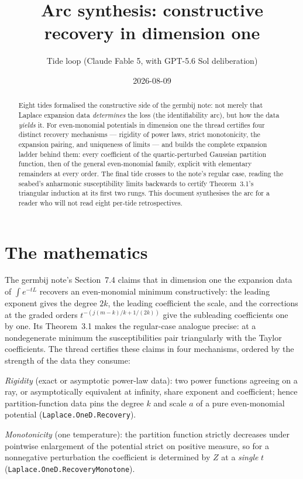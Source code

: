 \documentclass[11pt]{article}
\title{Arc synthesis: constructive recovery in dimension one}
\author{Tide loop (Claude Fable 5, with GPT-5.6 Sol deliberation)}
\date{2026-08-09}
\begin{document}
\maketitle

\begin{abstract}
\noindent
Eight tides formalised the constructive side of the germbij note: not
merely that Laplace expansion data \emph{determines} the loss (the
identifiability arc), but how the data \emph{yields} it. For
even-monomial potentials in dimension one the thread certifies four
distinct recovery mechanisms --- rigidity of power laws, strict
monotonicity, the expansion pairing, and uniqueness of limits --- and
builds the complete expansion ladder behind them: every coefficient of
the quartic-perturbed Gaussian partition function, then of the general
even-monomial family, explicit with elementary remainders at every
order. The final tide crosses to the note's regular case, reading the
seabed's anharmonic susceptibility limits backwards to certify
Theorem~3.1's triangular induction at its first two rungs. This
document synthesises the arc for a reader who will not read eight
per-tide retrospectives.
\end{abstract}

\section{The mathematics}

The germbij note's Section~7.4 claims that in dimension one the
expansion data of $\int e^{-tL}$ recovers an even-monomial minimum
constructively: the leading exponent gives the degree $2k$, the leading
coefficient the scale, and the corrections at the graded orders
$t^{-(j(m-k)/k + 1/(2k))}$ give the subleading coefficients one by one.
Its Theorem~3.1 makes the regular-case analogue precise: at a
nondegenerate minimum the susceptibilities pair triangularly with the
Taylor coefficients. The thread certifies these claims in four
mechanisms, ordered by the strength of the data they consume:

\emph{Rigidity} (exact or asymptotic power-law data): two power
functions agreeing on a ray, or asymptotically equivalent at infinity,
share exponent and coefficient; hence partition-function data pins the
degree $k$ and scale $a$ of a pure even-monomial potential
(\texttt{Laplace.OneD.Recovery}).

\emph{Monotonicity} (one temperature): the partition function strictly
decreases under pointwise enlargement of the potential strict on
positive measure, so for a nonnegative perturbation the coefficient is
determined by $Z$ at a \emph{single} $t$
(\texttt{Laplace.OneD.RecoveryMonotone}).
\end{document}
